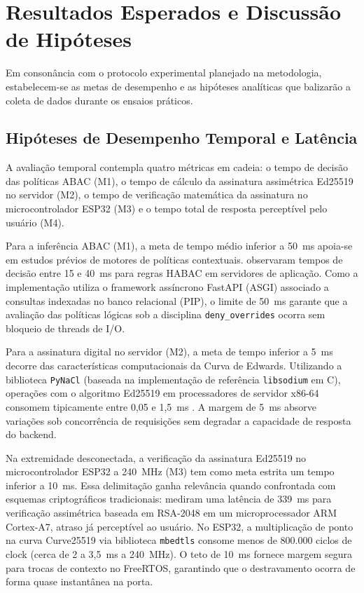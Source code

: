 \section{Resultados Esperados e Discussão de Hipóteses}
\label{sec:analise-quantitativa}

Em consonância com o protocolo experimental planejado na metodologia, estabelecem-se as metas de desempenho e as hipóteses analíticas que balizarão a coleta de dados durante os ensaios práticos.

\subsection{Hipóteses de Desempenho Temporal e Latência}
\label{subsec:res-desempenho-temporal}

A avaliação temporal contempla quatro métricas em cadeia: o tempo de decisão das políticas ABAC (M1), o tempo de cálculo da assinatura assimétrica Ed25519 no servidor (M2), o tempo de verificação matemática da assinatura no microcontrolador ESP32 (M3) e o tempo total de resposta perceptível pelo usuário (M4).

Para a inferência ABAC (M1), a meta de tempo médio inferior a 50~ms apoia-se em estudos prévios de motores de políticas contextuais.  observaram tempos de decisão entre 15 e 40~ms para regras HABAC em servidores de aplicação. Como a implementação utiliza o framework assíncrono FastAPI (ASGI) associado a consultas indexadas no banco relacional (PIP), o limite de 50~ms garante que a avaliação das políticas lógicas sob a disciplina \texttt{deny\_overrides} ocorra sem bloqueio de threads de I/O.

Para a assinatura digital no servidor (M2), a meta de tempo inferior a 5~ms decorre das características computacionais da Curva de Edwards. Utilizando a biblioteca \texttt{PyNaCl} (baseada na implementação de referência \texttt{libsodium} em C), operações com o algoritmo Ed25519 em processadores de servidor x86-64 consomem tipicamente entre 0,05 e 1,5~ms \cite{hanblockchainoffline2018}. A margem de 5~ms absorve variações sob concorrência de requisições sem degradar a capacidade de resposta do backend.

Na extremidade desconectada, a verificação da assinatura Ed25519 no microcontrolador ESP32 a 240~MHz (M3) tem como meta estrita um tempo inferior a 10~ms. Essa delimitação ganha relevância quando confrontada com esquemas criptográficos tradicionais:  mediram uma latência de 339~ms para verificação assimétrica baseada em RSA-2048 em um microprocessador ARM Cortex-A7, atraso já perceptível ao usuário. No ESP32, a multiplicação de ponto na curva Curve25519 via biblioteca \texttt{mbedtls} consome menos de 800.000 ciclos de clock (cerca de 2 a 3,5~ms a 240~MHz). O teto de 10~ms fornece margem segura para trocas de contexto no FreeRTOS, garantindo que o destravamento ocorra de forma quase instantânea na porta.

